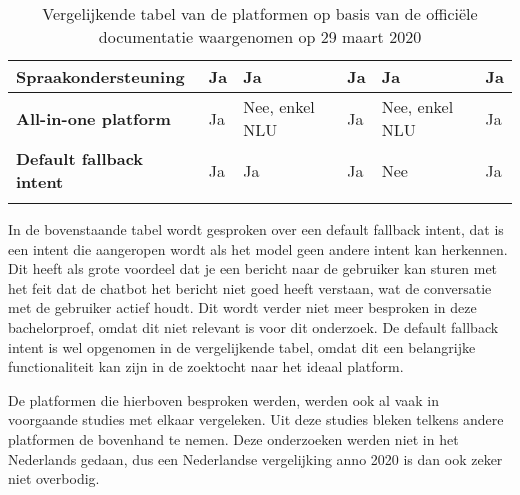 \begin{center}
\begin{longtable}{| P{2.2cm} | p{2.2cm} |  p{2.2cm} | p{2.2cm} | p{2.2cm} | p{2.2cm} |}
        \textbf{Spraakondersteuning}                                   & Ja                                                                      & Ja                             & Ja                                           & Ja                                     & Ja                                            \\  \hline
        \textbf{All-in-one platform}                                   & Ja                                                                      & Nee, enkel NLU                 & Ja                                           & Nee, enkel NLU                         & Ja                                            \\  \hline
        \textbf{Default fallback intent}                               & Ja                                                                      & Ja                             & Ja                                           & Nee                                    & Ja   \\ \hline    
        \caption{Vergelijkende tabel van de platformen op basis van de officiële documentatie waargenomen op 29 maart 2020}                                    
    \end{longtable}
\label{tbl:platformen}
\end{center}

In de bovenstaande tabel wordt gesproken over een default fallback intent, dat is een intent die aangeropen wordt als het model geen andere intent kan herkennen. Dit heeft als grote voordeel dat je een bericht naar de gebruiker kan sturen met het feit dat de chatbot het bericht niet goed heeft verstaan, wat de conversatie met de gebruiker actief houdt. Dit wordt verder niet meer besproken in deze bachelorproef, omdat dit niet relevant is voor dit onderzoek. De default fallback intent is wel opgenomen in de vergelijkende tabel, omdat dit een belangrijke functionaliteit kan zijn in de zoektocht naar het ideaal platform.

De platformen die hierboven besproken werden, werden ook al vaak in voorgaande studies met elkaar vergeleken. Uit deze studies bleken telkens andere platformen de bovenhand te nemen. Deze onderzoeken werden niet in het Nederlands gedaan, dus een Nederlandse vergelijking anno 2020 is dan ook zeker niet overbodig.


